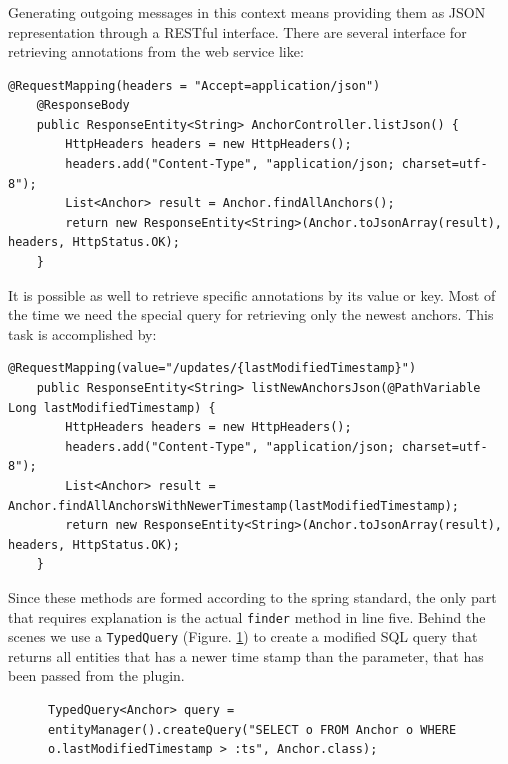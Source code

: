 \subsubsection[Generating Messages]{\reqWSvii}\label{reqWSvii}
Generating outgoing messages in this context means providing them as JSON representation through a RESTful interface. There are several interface for retrieving annotations from the web service like:
\begin{lstlisting}
@RequestMapping(headers = "Accept=application/json")
    @ResponseBody
    public ResponseEntity<String> AnchorController.listJson() {
        HttpHeaders headers = new HttpHeaders();
        headers.add("Content-Type", "application/json; charset=utf-8");
        List<Anchor> result = Anchor.findAllAnchors();
        return new ResponseEntity<String>(Anchor.toJsonArray(result), headers, HttpStatus.OK);
    }
\end{lstlisting}
It is possible as well to retrieve specific annotations by its value or key. Most of the time we need the special query for retrieving only the newest anchors. This task is accomplished by:

\begin{lstlisting}
@RequestMapping(value="/updates/{lastModifiedTimestamp}")
    public ResponseEntity<String> listNewAnchorsJson(@PathVariable Long lastModifiedTimestamp) {
        HttpHeaders headers = new HttpHeaders();
        headers.add("Content-Type", "application/json; charset=utf-8");
        List<Anchor> result = Anchor.findAllAnchorsWithNewerTimestamp(lastModifiedTimestamp);
        return new ResponseEntity<String>(Anchor.toJsonArray(result), headers, HttpStatus.OK);
    }
\end{lstlisting}

Since these methods are formed according to the spring standard, the only part that requires explanation is the actual \verb^finder^ method in line five. Behind the scenes we use a \verb^TypedQuery^ (Figure. \ref{typed-query}) to create a modified SQL query that returns all entities that has a newer time stamp than the parameter, that has been passed from the plugin.

\begin{figure}\centering
\begin{lstlisting}
TypedQuery<Anchor> query = entityManager().createQuery("SELECT o FROM Anchor o WHERE o.lastModifiedTimestamp > :ts", Anchor.class);
\end{lstlisting}
\label{typed-query}
\end{figure} 

